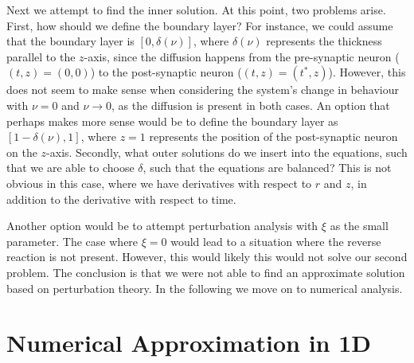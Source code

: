 \documentclass{article}
\begin{document}

Next we attempt to find the inner solution. At this point, two problems arise. First, how should we define the boundary layer? For instance, we could assume that the boundary layer is $[0,\delta(\nu)]$, where $\delta(\nu)$ represents the thickness parallel to the $z$-axis, since the diffusion happens from the pre-synaptic neuron ($(t,z) = (0,0)$) to the post-synaptic neuron ($(t,z) = (t^*,z)$). However, this does not seem to make sense when considering the system's change in behaviour with $\nu = 0$ and $\nu \rightarrow 0$, as the diffusion is present in both cases. An option that perhaps makes more sense would be to define the boundary layer as $[1-\delta(\nu),1]$, where $z = 1$ represents the position of the post-synaptic neuron on the $z$-axis. Secondly, what outer solutions do we insert into the equations, such that we are able to choose $\delta$, such that the equations are balanced? This is not obvious in this case, where we have derivatives with respect to $r$ and $z$, in addition to the derivative with respect to time. 

Another option would be to attempt perturbation analysis with $\xi$ as the small parameter. The case where $\xi = 0$ would lead to a situation where the reverse reaction is not present. However, this would likely this would not solve our second problem. The conclusion is that we were not able to find an approximate solution based on perturbation theory. In the following we move on to numerical analysis. 

\section{Numerical Approximation in 1D}
\end{document}

